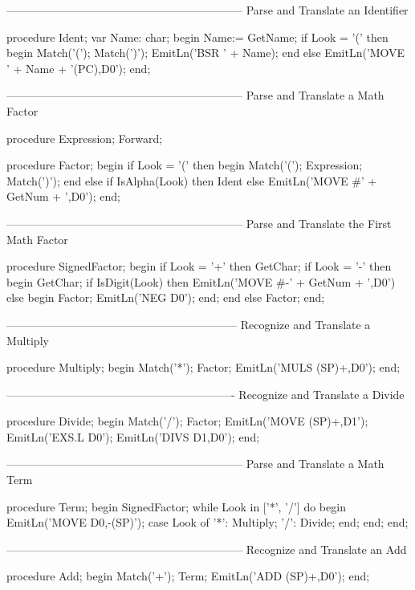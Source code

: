 \documentclass[float=false, crop=false]{standalone}
\begin{document}
\begin{code}
{---------------------------------------------------------------}
{ Parse and Translate an Identifier }

procedure Ident;
var Name: char;
begin
   Name:= GetName;
   if Look = '(' then begin
      Match('(');
      Match(')');
      EmitLn('BSR ' + Name);
      end
   else
      EmitLn('MOVE ' + Name + '(PC),D0');
end;


{---------------------------------------------------------------}
{ Parse and Translate a Math Factor }

procedure Expression; Forward;

procedure Factor;
begin
   if Look = '(' then begin
      Match('(');
      Expression;
      Match(')');
      end
   else if IsAlpha(Look) then
      Ident
   else
      EmitLn('MOVE #' + GetNum + ',D0');
end;


{---------------------------------------------------------------}
{ Parse and Translate the First Math Factor }


procedure SignedFactor;
begin
   if Look = '+' then
      GetChar;
   if Look = '-' then begin
      GetChar;
      if IsDigit(Look) then
         EmitLn('MOVE #-' + GetNum + ',D0')
      else begin
         Factor;
         EmitLn('NEG D0');
      end;
   end
   else Factor;
end;


{--------------------------------------------------------------}
{ Recognize and Translate a Multiply }

procedure Multiply;
begin
   Match('*');
   Factor;
   EmitLn('MULS (SP)+,D0');
end;


{-------------------------------------------------------------}
{ Recognize and Translate a Divide }

procedure Divide;
begin
   Match('/');
   Factor;
   EmitLn('MOVE (SP)+,D1');
   EmitLn('EXS.L D0');
   EmitLn('DIVS D1,D0');
end;


{---------------------------------------------------------------}
{ Parse and Translate a Math Term }

procedure Term;
begin
   SignedFactor;
   while Look in ['*', '/'] do begin
      EmitLn('MOVE D0,-(SP)');
      case Look of
       '*': Multiply;
       '/': Divide;
      end;
   end;
end;


{---------------------------------------------------------------}
{ Recognize and Translate an Add }

procedure Add;
begin
   Match('+');
   Term;
   EmitLn('ADD (SP)+,D0');
end;



\end{code}
\end{document}
